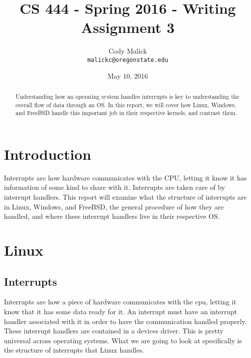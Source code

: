 \documentclass[10pt,letterpaper,onecolumn,draftclsnofoot]{IEEEtran}
\begin{document}
\begin{titlepage}
  \title{CS 444 - Spring 2016 - Writing Assignment 3}
  \author{Cody Malick\\
  \texttt{malickc@oregonstate.edu}}
  \date{May 10, 2016}
  \maketitle
  \vspace*{4cm}
  \begin{abstract}
      \noindent Understanding how an operating system handles interrupts is key
        to understanding the overall flow of data through an OS. In this report,
         we will cover how Linux, Windows, and FreeBSD handle this important job
         in their respective kernels, and contrast them.
  \end{abstract}
\end{titlepage}

\tableofcontents
\clearpage
\section{Introduction}
    Interrupts are how hardware communicates with the CPU, letting it know it
    has information of some kind to share with it. Interrupts are taken care
    of by interrupt handlers. This report will examine what the structure of
    interrupts are in Linux, Windows, and FreeBSD, the general procedure of
    how they are handled, and where these interrupt handlers live in their
    respective OS. 
\section{Linux}
  \subsection{Interrupts}
  Interrupts are how a piece of hardware communicates with the cpu, letting it
  know that it has some data ready for it. An interrupt must have an interrupt
  handler associated with it in order to have the communication handled properly.
  These interrupt handlers are contained in a devices driver. This is pretty
  universal across operating systems. What we are going to look at specifically
  is the structure of interrupts that Linux handles. \cite{robertlove2010}
\end{document}
